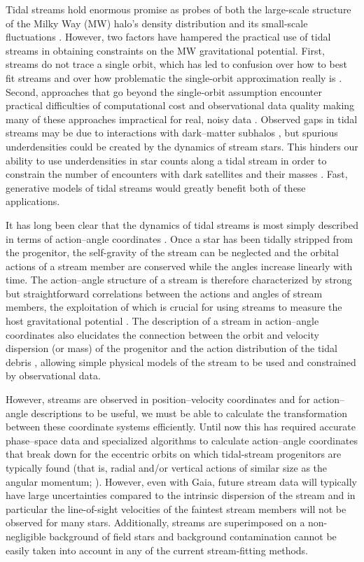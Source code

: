 \documentclass[12pt,preprint]{aastex}
\newcommand{\eg}{e.g.}
\begin{document}
Tidal streams hold enormous promise as probes of both the large-scale
structure of the Milky Way (MW) halo's density distribution
\citep[\eg,][]{Johnston99a,Koposov10a} and its small-scale
fluctuations \citep{Carlberg09a,Carlberg12a}. However, two factors
have hampered the practical use of tidal streams in obtaining
constraints on the MW gravitational potential. First, streams do not
trace a single orbit, which has led to confusion over how to best fit
streams and over how problematic the single-orbit approximation really
is \citep{Eyre11a,Sanders13a}. Second, approaches that go beyond the
single-orbit assumption encounter practical difficulties of
computational cost and observational data quality making many of these
approaches impractical for real, noisy data
\citep{Sanders13b,PriceWhelan13a}. Observed gaps in tidal streams may
be due to interactions with dark--matter subhalos \citep{Yoon11a}, but
spurious underdensities could be created by the dynamics of stream
stars. This hinders our ability to use underdensities in star counts
along a tidal stream in order to constrain the number of encounters
with dark satellites and their masses \citep{Ngan14a}. Fast,
generative models of tidal streams would greatly benefit both of these
applications.

It has long been clear that the dynamics of tidal streams is most
simply described in terms of action--angle coordinates
\citep{Tremaine99a,Helmi99a}. Once a star has been tidally stripped
from the progenitor, the self-gravity of the stream can be neglected
and the orbital actions of a stream member are conserved while the
angles increase linearly with time. The action--angle structure of a
stream is therefore characterized by strong but straightforward
correlations between the actions and angles of stream members, the
exploitation of which is crucial for using streams to measure the host
gravitational potential \citep{Sanders13b}. The description of a
stream in action--angle coordinates also elucidates the connection
between the orbit and velocity dispersion (or mass) of the progenitor
and the action distribution of the tidal debris \citep{Eyre11a},
allowing simple physical models of the stream to be used and
constrained by observational data.

However, streams are observed in position--velocity coordinates and
for action--angle descriptions to be useful, we must be able to
calculate the transformation between these coordinate systems
efficiently. Until now this has required accurate phase--space data
\citep{Sanders13b} and specialized algorithms to calculate
action--angle coordinates that break down for the eccentric orbits on
which tidal-stream progenitors are typically found (that is, radial
and/or vertical actions of similar size as the angular momentum;
\citealt{Sanders12a}). However, even with Gaia, future stream data
will typically have large uncertainties compared to the intrinsic
dispersion of the stream and in particular the line-of-sight
velocities of the faintest stream members will not be observed for
many stars. Additionally, streams are superimposed on a non-negligible
background of field stars and background contamination cannot be
easily taken into account in any of the current stream-fitting
methods.
\end{document}
